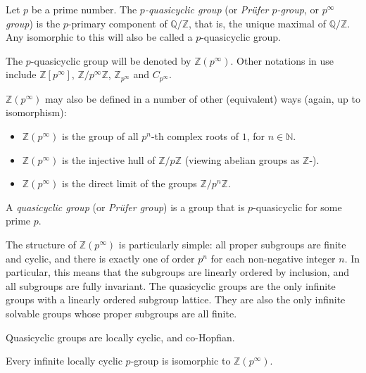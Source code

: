 \documentclass[12pt]{article}
\def\N{\mathbb{N}}
\def\Q{\mathbb{Q}}
\def\Z{\mathbb{Z}}
\begin{document}

Let $p$ be a prime number.
The \emph{$p$-quasicyclic group} (or \emph{Pr\"ufer $p$-group}, or \emph{$p^\infty$ group}) is the $p$-primary component of $\Q/\Z$,
that is, the unique maximal  of $\Q/\Z$.
Any  isomorphic to this will also be called a $p$-quasicyclic group.

The $p$-quasicyclic group will be denoted by $\Z(p^\infty)$.
Other notations in use include $\Z[p^\infty]$, $\Z/p^\infty\Z$,
$\Z_{p^\infty}$ and $C_{p^\infty}$.

$\Z(p^\infty)$ may also be defined in a number of other (equivalent) ways
(again, up to isomorphism):
\begin{itemize}
\item $\Z(p^\infty)$ is
the group of all $p^n$-th complex roots of $1$, for $n\in\N$.
\item $\Z(p^\infty)$ is
the injective hull of $\Z/p\Z$ (viewing abelian groups as $\Z$-).
\item $\Z(p^\infty)$ is the direct limit of the groups $\Z/p^n\Z$.
\end{itemize}

A \emph{quasicyclic group} (or \emph{Pr\"ufer group}) is
a group that is $p$-quasicyclic for some prime $p$.

The  structure of $\Z(p^\infty)$ is particularly simple:
all proper subgroups are finite and cyclic,
and there is exactly one of order $p^n$ for each non-negative integer $n$.
In particular,
this means that the subgroups are linearly ordered by inclusion,
and all subgroups are fully invariant.
The quasicyclic groups are
the only infinite groups with a linearly ordered subgroup lattice.
They are also
the only infinite solvable groups whose proper subgroups are all finite.

Quasicyclic groups are locally cyclic,  and co-Hopfian.

Every infinite locally cyclic $p$-group is isomorphic to $\Z(p^\infty)$.
\end{document}
